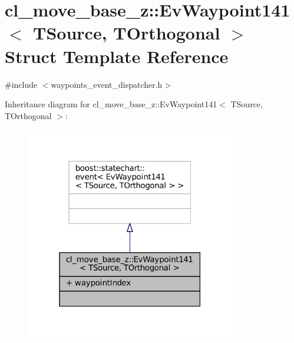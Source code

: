 \hypertarget{structcl__move__base__z_1_1EvWaypoint141}{}\section{cl\+\_\+move\+\_\+base\+\_\+z\+:\+:Ev\+Waypoint141$<$ T\+Source, T\+Orthogonal $>$ Struct Template Reference}
\label{structcl__move__base__z_1_1EvWaypoint141}


{\ttfamily \#include $<$waypoints\+\_\+event\+\_\+dispatcher.\+h$>$}



Inheritance diagram for cl\+\_\+move\+\_\+base\+\_\+z\+:\+:Ev\+Waypoint141$<$ T\+Source, T\+Orthogonal $>$\+:
\nopagebreak
\begin{figure}[H]
\begin{center}
\leavevmode
\includegraphics[width=259pt]{structcl__move__base__z_1_1EvWaypoint141__inherit__graph}
\end{center}
\end{figure}


